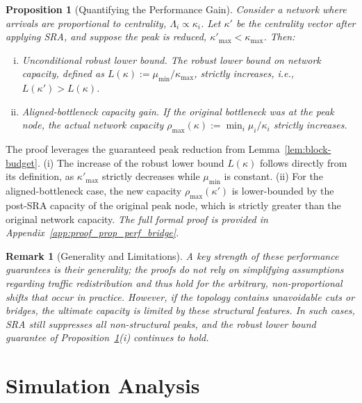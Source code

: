 \documentclass[journal]{IEEEtran}
\newtheorem{proposition}{Proposition}
\newtheorem{remark}{Remark}
\begin{document}
\begin{proposition}[Quantifying the Performance Gain]
\label{prop:perf-bridge}
Consider a network where arrivals are proportional to centrality, $\Lambda_i \propto \kappa_i$. Let $\kappa'$ be the centrality vector after applying SRA, and suppose the peak is reduced, $\kappa'_{\max}<\kappa_{\max}$. Then:
\begin{enumerate}[(i)]
\item \emph{Unconditional robust lower bound.} The robust lower bound on network capacity, defined as $L(\kappa):=\mu_{\min}/\kappa_{\max}$, strictly increases, i.e., $L(\kappa')>L(\kappa)$.
\item \emph{Aligned-bottleneck capacity gain.} If the original bottleneck was at the peak node, the actual network capacity $\rho_{\max}(\kappa):=\min_{i} \mu_i/\kappa_i$ strictly increases.
\end{enumerate}
\end{proposition}
\begin{IEEEproof}
The proof leverages the guaranteed peak reduction from Lemma~\ref{lem:block-budget}. (i) The increase of the robust lower bound $L(\kappa)$ follows directly from its definition, as $\kappa'_{\max}$ strictly decreases while $\mu_{\min}$ is constant. (ii) For the aligned-bottleneck case, the new capacity $\rho_{\max}(\kappa')$ is lower-bounded by the post-SRA capacity of the original peak node, which is strictly greater than the original network capacity. \textit{The full formal proof is provided in Appendix~\ref{app:proof_prop_perf_bridge}.}
\end{IEEEproof}

\begin{remark}[Generality and Limitations]
A key strength of these performance guarantees is their generality; the proofs do not rely on simplifying assumptions regarding traffic redistribution and thus hold for the arbitrary, non-proportional shifts that occur in practice. However, if the topology contains unavoidable cuts or bridges, the ultimate capacity is limited by these structural features. In such cases, SRA still suppresses all \emph{non-structural} peaks, and the robust lower bound guarantee of Proposition~\ref{prop:perf-bridge}(i) continues to hold.
\end{remark}

\section{Simulation Analysis}
\label{sec:simulation}
\end{document}
